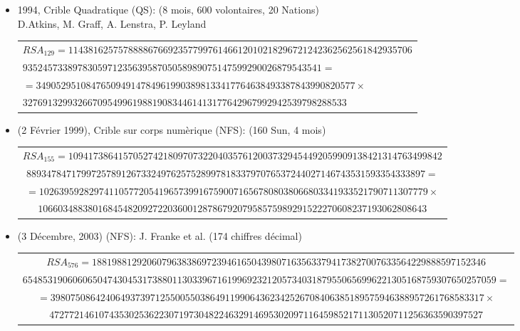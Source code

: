 \documentclass[landscape]{powersem} %
\newcommand{\psd}{\pause}%
\newcommand{\heading}[1]{%
 \begin{center}
  \large\bf
  \Ovalbox{{\textcolor{conceptcolor}{#1}}}%
 \end{center}
 \vspace{1ex minus 1ex}}
\begin{document}
\begin{slide}
\heading{Factorisation Contemporanea}\vspace{-3mm}\psd

\begin{itemize}
  \item[\textcolor{blue}{\ding{182}}] 1994, Crible Quadratique (QS): (8 mois, 600 volontaires, 20 Nations)\\
  D.Atkins, M. Graff, A. Lenstra, P. Leyland
\begin{tiny}\begin{tabular}{l}
$  RSA_{129} = 114381625757888867669235779976146612010218296721242362562561842935706$\\
\hspace*{5mm}$935245733897830597123563958705058989075147599290026879543541=$\\
$        = 3490529510847650949147849619903898133417764638493387843990820577 \times$\\
$
32769132993266709549961988190834461413177642967992942539798288533
$\end{tabular}\end{tiny}\psd

  \item[\textcolor{blue}{\ding{183}}] (2 F\'evrier 1999), Crible sur corps num\`erique (NFS): (160 Sun, 4 mois)
 \begin{tiny}\begin{tabular}{c}
\hspace*{-1cm}$ RSA_{155} = 109417386415705274218097073220403576120037329454492059909138421314763499842$\\
$88934784717997257891267332497625752899781833797076537244027146743531593354333897=$\\
$=102639592829741105772054196573991675900716567808038066803341933521790711307779
\times$\\
$106603488380168454820927220360012878679207958575989291522270608237193062808643
$\end{tabular}\end{tiny}\psd

  \item[\textcolor{blue}{\ding{184}}] (3 D\'ecembre, 2003) (NFS): J. Franke et al. (174 chiffres d\'ecimal)
 \begin{tiny}\begin{tabular}{c}
\hspace*{-1cm}$ RSA_{576} = 1881988129206079638386972394616504398071635633794173827007633564229888597152346$\\
$65485319060606504743045317388011303396716199692321205734031879550656996221305168759307650257059=$\\
$=398075086424064937397125500550386491199064362342526708406385189575946388957261768583317\times$\\
$472772146107435302536223071973048224632914695302097116459852171130520711256363590397527
$\end{tabular}\end{tiny}\psd


\end{itemize}
\end{slide}
\end{document}
